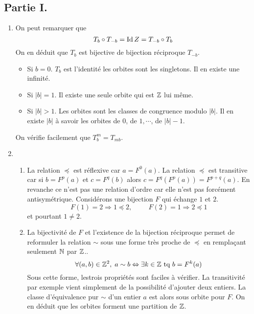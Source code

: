 \subsection*{Partie I.}
\begin{enumerate}
 \item On peut remarquer que 
\begin{displaymath}
 T_b \circ T_{-b} = \operatorname{Id}\\Z = T_{-b} \circ T_b
\end{displaymath}
On en déduit que $T_b$ est bijective de bijection réciproque $T_{-b}$.
\begin{itemize}
 \item Si $b=0$. $T_b$ est l'identité les orbites sont les singletons. Il en existe une infinité.
 \item Si $|b|=1$. Il existe une seule orbite qui est $\mathbb{Z}$ lui même.
 \item Si $|b|> 1$. Les orbites sont les classes de congruence modulo $|b|$. Il en existe $|b|$ à savoir les orbites de $0$, de $1, \cdots$, de $|b|-1$. 
\end{itemize}
On vérifie facilement que $T_b^m = T_{mb}$.

 \item
\begin{enumerate}
 \item La relation $\preceq$ est réflexive car $a=F^0(a)$.\newline
 La relation $\preceq$ est transitive car si $b = F^p(a)$ et $c=F^q(b)$ alors $c = F^q(F^p(a)) = F^{p+q}(a)$.\newline
 En revanche ce n'est pas une relation d'ordre car elle n'est pas forcément antisymétrique. Considérons une bijection $F$ qui échange $1$ et $2$.
 \begin{displaymath}
 F(1) = 2 \Rightarrow 1 \preceq 2,\hspace{1cm} F(2) = 1 \Rightarrow 2 \preceq 1
 \end{displaymath}
et pourtant $1\neq 2$.

 \item La bijectivité de $F$ et l'existence de la bijection réciproque permet de reformuler la relation $\sim$ sous une forme très proche de $\preceq$ en remplaçant seulement $\mathbb{N}$ par $\mathbb{Z}$..
\begin{displaymath}
 \forall (a,b)\in \mathbb{Z}^2, \; a \sim b \Leftrightarrow \exists k \in \mathbb{Z} \text{ tq } b = F^{k}(a)
\end{displaymath}
Sous cette forme, lestrois propriétés sont faciles à vérifier. La transitivité par exemple vient simplement de la possibilité d'ajouter deux entiers.\newline
La classe d'équivalence pur $\sim$ d'un entier $a$ est alors sous orbite pour $F$. On en déduit que les orbites forment une partition de $\mathbb{Z}$.


\end{enumerate}
\end{enumerate}
